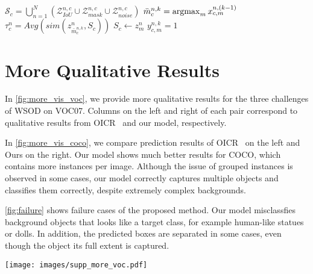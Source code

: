 \documentclass[runningheads]{llncs}
\newcommand{\argmax}{\operatornamewithlimits{argmax}}
\begin{document}
\begin{algorithm}[H]
\begin{algorithmic}[1]
    \ENDFOR
    \STATE $\mathcal{S}_c = \bigcup_{n=1}^N ( \mathcal{Z}^{n,c}_{IoU} \cup \mathcal{Z}^{n,c}_{mask} \cup \mathcal{Z}^{n,c}_{noise} )$
            \STATE $\bar{m}^{n,k}_c=\argmax_m {x^{n,(k-1)}_{c,m}}$
\STATE $\tau^n_c = Avg(sim(z^n_{\bar{m}^{n,k}_c}, S_{c}))$
                \STATE $S_c  \leftarrow{z^{n}_{m}}$
                  \STATE $y^{n,k}_{c,m} = 1$
                \ENDIF
            \ENDIF
        \ENDIF
      \ENDFOR
    \ENDFOR
\end{algorithmic}
\label{alg:OD}
\end{algorithm}

\clearpage
\section{More Qualitative Results}  
\label{sec:more_qual}
In \cref{fig:more_vis_voc}, we provide more qualitative results for the three challenges of WSOD on VOC07. 
Columns on the left and right of each pair correspond to qualitative results from OICR~\cite{Tang_2017_CVPR} and our model, respectively.

In \cref{fig:more_vis_coco}, we compare prediction results of OICR~\cite{Tang_2017_CVPR} on the left and Ours on the right.  
Our model shows much better results for COCO, which contains more instances per image. Although the issue of grouped instances is observed in some cases, our model correctly captures multiple objects and classifies them correctly, despite extremely complex backgrounds.

\cref{fig:failure} shows failure cases of the proposed method. Our model misclassfies background objects that looks like a target class, for example human-like statues or dolls. In addition, the predicted boxes are separated in some cases, even though the object its full extent is captured.

\begin{figure*}[ht!]
\centering
\texttt{[image: images/supp\_more\_voc.pdf]}
\caption{More qualitative results for the three challenges of WSOD on VOC07.}
\label{fig:more_vis_voc}
\end{figure*}

\begin{comment}
\begin{figure*}[ht!]
\centering
\texttt{[image: images/supp\_more\_missing.pdf]}
\caption{Qualitative results for multiple instance labeling method on VOC07.}
\label{fig:more_vis_missing}
\end{figure*}
\end{comment}
\end{document}
